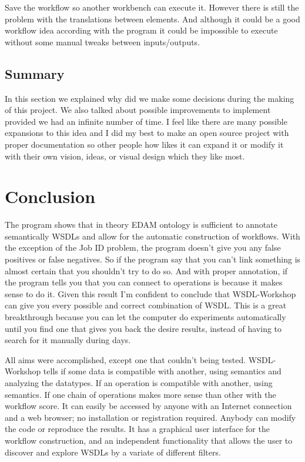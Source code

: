 \documentclass[a4paper,10pt]{article}
\begin{document}
  Save the workflow so another workbench can execute it. However there is still the problem with the translations between elements. And although it could be a good workflow idea according with the program it could be impossible to execute without some manual tweaks between inputs/outputs.

  \subsection{Summary}

  In this section we explained why did we make some decisions during the making of this project. We also talked about possible improvements to implement provided we had an infinite number of time. I feel like there are many possible expansions to this idea and I did my best to make an open source project with proper documentation so other people how likes it can expand it or modify it with their own vision, ideas, or visual design which they like most.
	
\newpage

\section{Conclusion}

  The program shows that in theory EDAM ontology is sufficient to annotate semantically WSDLs and allow for the automatic construction of workflows. With the exception of the Job ID problem, the program doesn't give you any false positives or false negatives. So if the program say that you can't link something is almost certain that you shouldn't try to do so. And with proper annotation, if the program tells you that you can connect to operations is because it makes sense to do it. Given this result I'm confident to conclude that WSDL-Workshop can give you every possible and correct combination of WSDL. This is a great breakthrough because you can let the computer do experiments automatically until you find one that gives you back the desire results, instead of having to search for it manually during days.\vspace{3 mm}

  All aims were accomplished, except one that couldn't being tested. WSDL-Workshop tells if some data is compatible with another, using semantics and analyzing the datatypes. If an operation is compatible with another, using semantics. If one chain of operations makes more sense than other with the workflow score. It can easily be accessed by anyone with an Internet connection and a web browser; no installation or registration required. Anybody can modify the code or reproduce the results. It has a graphical user interface for the workflow construction, and an independent functionality that allows the user to discover and explore WSDLs by a variate of different filters.\vspace{3 mm}
\end{document}
